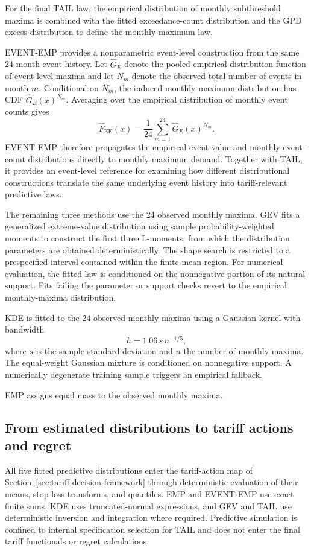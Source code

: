 \documentclass[Times1COL]{WileyNJDv5}
\begin{document}
For the final TAIL law, the empirical distribution of monthly
subthreshold maxima is combined with the fitted exceedance-count
distribution and the GPD excess distribution to define the monthly-maximum
law. 

EVENT-EMP provides a nonparametric event-level construction from the
same 24-month event history. Let $\widehat G_E$ denote the pooled
empirical distribution function of event-level maxima and let $N_m$
denote the observed total number of events in month $m$. Conditional on
$N_m$, the induced monthly-maximum distribution has CDF
$\widehat G_E(x)^{N_m}$. Averaging over the empirical distribution of
monthly event counts gives
\[
\widehat F_{\mathrm{EE}}(x)
=
\frac{1}{24}
\sum_{m=1}^{24}
\widehat G_E(x)^{N_m}.
\]
EVENT-EMP therefore propagates the empirical event-value and monthly
event-count distributions directly to monthly maximum demand. Together
with TAIL, it provides an event-level reference for examining how
different distributional constructions translate the same underlying
event history into tariff-relevant predictive laws.

The remaining three methods use the 24 observed monthly maxima. GEV fits a
generalized extreme-value distribution using sample probability-weighted
moments to construct the first three L-moments, from which the
distribution parameters are obtained deterministically. The shape search
is restricted to a prespecified interval contained within the finite-mean
region. For numerical evaluation, the fitted law is conditioned on the
nonnegative portion of its natural support. Fits failing the parameter or
support checks revert to the empirical monthly-maxima distribution.

KDE is fitted to the 24 observed monthly maxima using a Gaussian kernel with bandwidth
\[
h=1.06\,s\,n^{-1/5},
\]
where $s$ is the sample standard deviation and $n$ the number of
monthly maxima. The equal-weight Gaussian mixture is conditioned on
nonnegative support. A numerically degenerate training sample triggers
an empirical fallback.

EMP assigns equal mass to the observed monthly maxima.

\subsection{From estimated distributions to tariff actions and regret}
\label{sec:estimated-actions-regret}

All five fitted predictive distributions enter the tariff-action map
of Section~\ref{sec:tariff-decision-framework} through deterministic
evaluation of their means, stop-loss transforms, and quantiles. EMP and
EVENT-EMP use exact finite sums, KDE uses truncated-normal expressions,
and GEV and TAIL use deterministic inversion and integration where
required. Predictive simulation is confined to internal specification
selection for TAIL and does not enter the final tariff functionals or
regret calculations.
\end{document}
